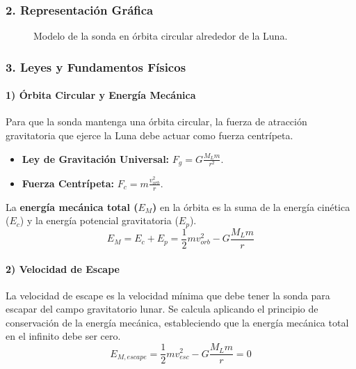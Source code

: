 \subsubsection*{2. Representación Gráfica}
\begin{figure}[H]
    \centering
    \caption{Modelo de la sonda en órbita circular alrededor de la Luna.}
\end{figure}

\subsubsection*{3. Leyes y Fundamentos Físicos}
\paragraph{1) Órbita Circular y Energía Mecánica}
Para que la sonda mantenga una órbita circular, la fuerza de atracción gravitatoria que ejerce la Luna debe actuar como fuerza centrípeta.
\begin{itemize}
    \item \textbf{Ley de Gravitación Universal:} $F_g = G \frac{M_L m}{r^2}$.
    \item \textbf{Fuerza Centrípeta:} $F_c = m \frac{v_{orb}^2}{r}$.
\end{itemize}
La \textbf{energía mecánica total ($E_M$)} en la órbita es la suma de la energía cinética ($E_c$) y la energía potencial gravitatoria ($E_p$).
$$ E_M = E_c + E_p = \frac{1}{2}mv_{orb}^2 - G\frac{M_L m}{r} $$
\paragraph{2) Velocidad de Escape}
La velocidad de escape es la velocidad mínima que debe tener la sonda para escapar del campo gravitatorio lunar. Se calcula aplicando el principio de conservación de la energía mecánica, estableciendo que la energía mecánica total en el infinito debe ser cero.
$$ E_{M, escape} = \frac{1}{2}mv_{esc}^2 - G\frac{M_L m}{r} = 0 $$

